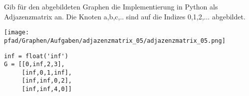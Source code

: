 ﻿\question[4]
Gib für den abgebildeten Graphen die Implementierung in Python als Adjazenzmatrix an.
Die Knoten a,b,c,.. sind auf die Indizes 0,1,2,... abgebildet.

\texttt{[image: \\pfad/Graphen/Aufgaben/adjazenzmatrix\_05/adjazenzmatrix\_05.png]}
\begin{solutionbox}{5cm}
\begin{lstlisting}
inf = float('inf')
G = [[0,inf,2,3],
     [inf,0,1,inf],
     [inf,inf,0,2],
     [inf,inf,4,0]]

\end{lstlisting}
\end{solutionbox}
